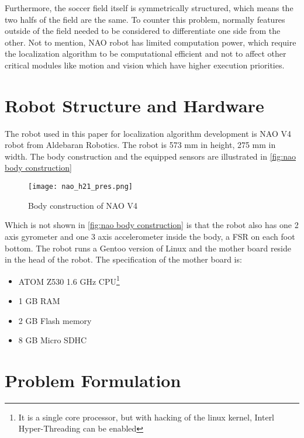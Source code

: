 Furthermore, the soccer field itself is symmetrically structured, which means the two halfs of the field are the same. To counter this problem, normally features outside of the field needed to be considered to differentiate one side from the other.
Not to mention,  NAO robot has limited computation power, which require the localization algorithm to be computational efficient and not to affect other critical modules like motion and vision which have higher execution priorities.

\section{Robot Structure and Hardware}
The robot used in this paper for localization algorithm development is NAO V4 robot from Aldebaran Robotics{\textregistered}. The robot is 573 mm in height, 275 mm in width. The body construction and the equipped sensors are illustrated in \autoref{fig:nao body construction}

\begin{figure}[htb]
  \centering
  \texttt{[image: nao\_h21\_pres.png]}
  \caption{Body construction of NAO V4}
  \label{fig:nao body construction}
\end{figure}

Which is not shown in \autoref{fig:nao body construction} is that the robot also has one 2 axis gyrometer and one 3 axis accelerometer inside the body, a \gls{FSR} on each foot bottom.
The robot runs a Gentoo version of Linux and the mother board reside in the head of the robot. The specification of the mother board is:
\begin{itemize}
  \item ATOM Z530 1.6 GHz CPU\footnote{It is a single core processor, but with hacking of the linux kernel, Interl{\textregistered} Hyper-Threading can be enabled}
\item 1 GB RAM
\item 2 GB Flash memory
\item 8 GB Micro SDHC
\end{itemize}



\section{Problem Formulation}

